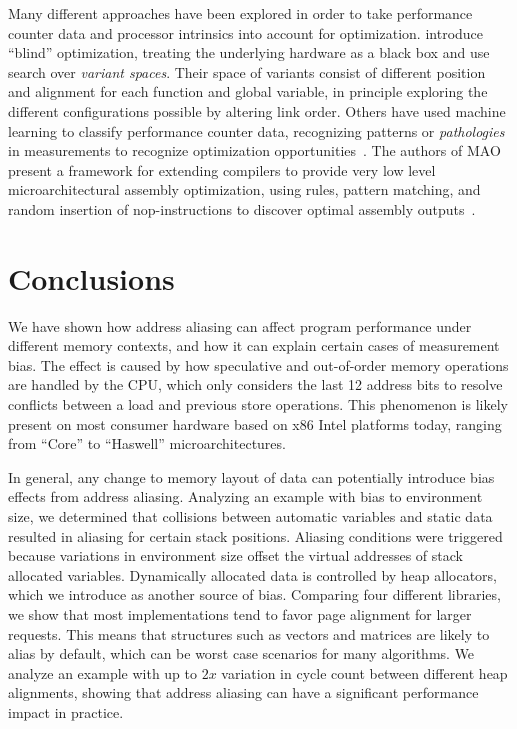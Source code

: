 \documentclass[prodmode,acmtaco]{acmsmall}
\begin{document}
Many different approaches have been explored in order to take performance counter data and processor intrinsics into account for optimization.
 introduce ``blind'' optimization, treating the underlying hardware as a black box and use search over \emph{variant spaces}.
Their space of variants consist of different position and alignment for each function and global variable, in principle exploring the different configurations possible by altering link order.
Others have used machine learning to classify performance counter data, recognizing patterns or \emph{pathologies} in measurements to recognize optimization opportunities~\cite{Yoo:ADD}.
The authors of MAO present a framework for extending compilers to provide very low level microarchitectural assembly optimization, using rules, pattern matching, and random insertion of nop-instructions to discover optimal assembly outputs~\cite{Hundt:2011:MAO}. 


\section{Conclusions}
\label{sec:conclusions}
We have shown how address aliasing can affect program performance under different memory contexts, and how it can explain certain cases of measurement bias. 
The effect is caused by how speculative and out-of-order memory operations are handled by the CPU, which only considers the last 12 address bits to resolve conflicts between a load and previous store operations.
This phenomenon is likely present on most consumer hardware based on x86 Intel platforms today, ranging from ``Core'' to ``Haswell'' microarchitectures.

In general, any change to memory layout of data can potentially introduce bias effects from address aliasing.
Analyzing an example with bias to environment size, we determined that collisions between automatic variables and static data resulted in aliasing for certain stack positions.
Aliasing conditions were triggered because variations in environment size offset the virtual addresses of stack allocated variables.
Dynamically allocated data is controlled by heap allocators, which we introduce as another source of bias.
Comparing four different libraries, we show that most implementations tend to favor page alignment for larger requests.
This means that structures such as vectors and matrices are likely to alias by default, which can be worst case scenarios for many algorithms.
We analyze an example with up to $2x$ variation in cycle count between different heap alignments, showing that address aliasing can have a significant performance impact in practice.
\end{document}
